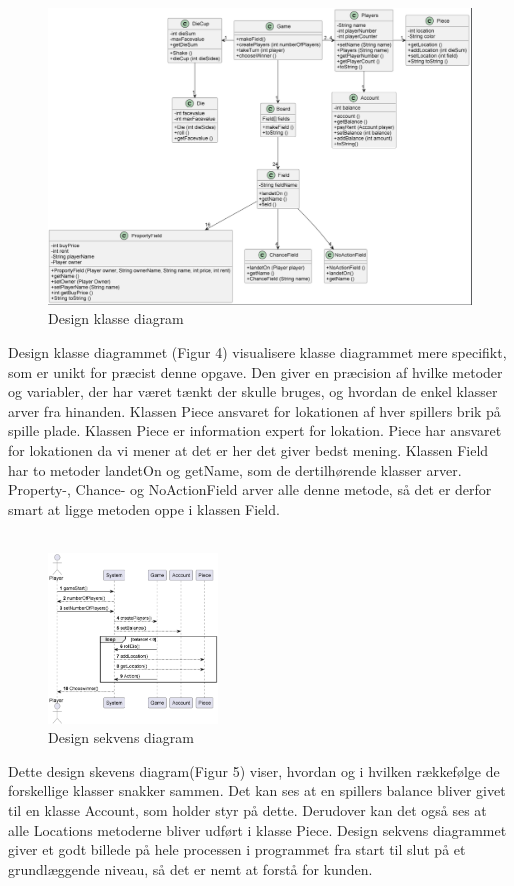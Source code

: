 \documentclass{article}
\begin{document}
\begin{figure} [h]
    \centering
    \includegraphics[width = 1.0\textwidth]{Billeder/Designklassediagram.png}
    \caption{Design klasse diagram}
    \label{Design klasse diagram}
\end{figure}
Design klasse diagrammet (Figur 4) visualisere klasse diagrammet mere specifikt, som er unikt for præcist denne opgave. Den giver en præcision af hvilke metoder og variabler, der har været tænkt der skulle bruges, og hvordan de enkel klasser arver fra hinanden. Klassen Piece ansvaret for lokationen af hver spillers brik på spille plade. Klassen Piece er information expert for lokation. Piece har ansvaret for lokationen da vi mener at det er her det giver bedst mening. Klassen Field har  to metoder landetOn og getName, som de dertilhørende klasser arver. Property-, Chance- og NoActionField arver alle denne metode, så det er derfor smart at ligge metoden oppe i klassen Field. 
\\
\\
\begin{figure} [h]
    \centering
    \includegraphics[width = 0.4\textwidth]{Billeder/designsekvensdiagram.png}
    \caption{Design sekvens diagram}
    \label{Design sekvens diagram}
\end{figure}
Dette design skevens diagram(Figur 5) viser, hvordan og i hvilken rækkefølge de forskellige klasser snakker sammen. Det kan ses at en  spillers balance bliver givet til en klasse Account, som holder styr på dette. Derudover kan det også ses at alle Locations metoderne bliver udført i klasse Piece. Design sekvens diagrammet giver et godt billede på hele processen i programmet fra start til slut på et grundlæggende niveau, så det er nemt at forstå for kunden. 
\\
\\
\end{document}
